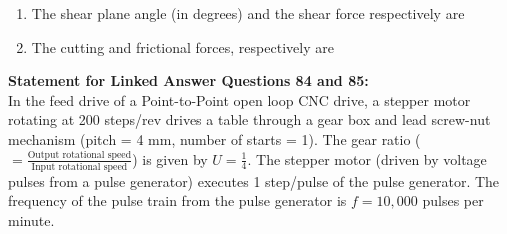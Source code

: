 \documentclass[journal,12pt,onecolumn]{IEEEtran}
\begin{document}
\begin{enumerate}[resume]
    \item The shear plane angle (in degrees) and the shear force respectively are
          \begin{enumerate}
          \end{enumerate}

    \item The cutting and frictional forces, respectively are
          \begin{enumerate}
          \end{enumerate}

\end{enumerate}
\normalsize\textbf{Statement for Linked Answer Questions 84 and 85:}\\
In the feed drive of a Point-to-Point open loop CNC drive, a stepper motor rotating at 200 steps/rev drives a table through a gear box and lead screw-nut mechanism (pitch = 4 mm, number of starts = 1). The gear ratio ($=\frac{\text{Output rotational speed}}{\text{Input rotational speed}}$) is given by $U=\frac{1}{4}$. The stepper motor (driven by voltage pulses from a pulse generator) executes 1 step/pulse of the pulse generator. The frequency of the pulse train from the pulse generator is $f=10,000$ pulses per minute.
\end{document}

